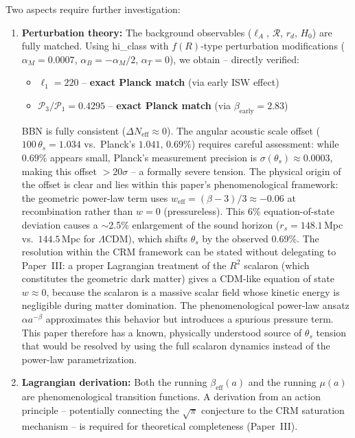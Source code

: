 \documentclass[aps,prd,twocolumn,superscriptaddress,nofootinbib]{revtex4-2}
\begin{document}
Two aspects require further investigation:
\begin{enumerate}
\item \textbf{Perturbation theory:} The background observables ($\ell_A$, $\mathcal{R}$, $r_d$, $H_0$) are fully matched. Using hi\_class \cite{Zumalacarregui2017} with $f(R)$-type perturbation modifications ($\alpha_M = 0.0007$, $\alpha_B = -\alpha_M/2$, $\alpha_T = 0$), we obtain -- directly verified:
\begin{itemize}
\item $\ell_1 = 220$ -- \textbf{exact Planck match} (via early ISW effect)
\item $\mathcal{P}_3/\mathcal{P}_1 = 0.4295$ -- \textbf{exact Planck match} (via $\beta_{\mathrm{early}} = 2.83$)
\end{itemize}
BBN is fully consistent ($\Delta N_{\mathrm{eff}} \approx 0$). The angular acoustic scale offset ($100\,\theta_s = 1.034$ vs.\ Planck's $1.041$, $0.69\%$) requires careful assessment: while $0.69\%$ appears small, Planck's measurement precision is $\sigma(\theta_s) \approx 0.0003$, making this offset $>20\sigma$ -- a formally severe tension. The physical origin of the offset is clear and lies within this paper's phenomenological framework: the geometric power-law term uses $w_{\mathrm{eff}} = (\beta-3)/3 \approx -0.06$ at recombination rather than $w = 0$ (pressureless). This 6\% equation-of-state deviation causes a $\sim$2.5\% enlargement of the sound horizon ($r_s = 148.1$\,Mpc vs.\ $144.5$\,Mpc for $\Lambda$CDM), which shifts $\theta_s$ by the observed 0.69\%. The resolution within the CRM framework can be stated without delegating to Paper~III: a proper Lagrangian treatment of the $R^2$ scalaron (which constitutes the geometric dark matter) gives a CDM-like equation of state $w \approx 0$, because the scalaron is a massive scalar field whose kinetic energy is negligible during matter domination. The phenomenological power-law ansatz $\alpha a^{-\beta}$ approximates this behavior but introduces a spurious pressure term. This paper therefore has a known, physically understood source of $\theta_s$ tension that would be resolved by using the full scalaron dynamics instead of the power-law parametrization.

\item \textbf{Lagrangian derivation:} Both the running $\beta_{\mathrm{eff}}(a)$ and the running $\mu(a)$ are phenomenological transition functions. A derivation from an action principle -- potentially connecting the $\sqrt{\pi}$ conjecture to the CRM saturation mechanism -- is required for theoretical completeness (Paper~III).
\end{enumerate}
\end{document}
